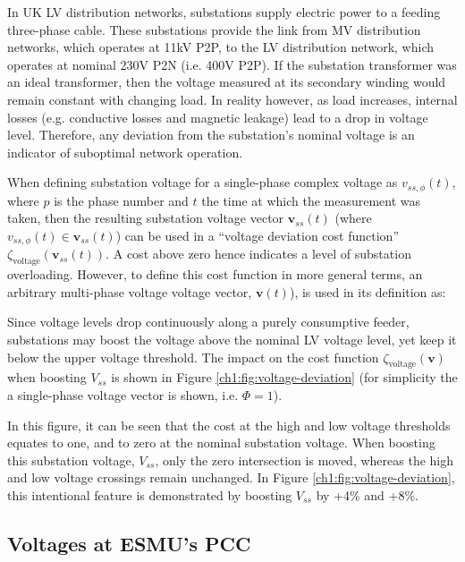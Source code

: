 In UK LV distribution networks, substations supply electric power to a feeding three-phase cable.
These substations provide the link from MV distribution networks, which operates at 11kV P2P, to the LV distribution network, which operates at nominal 230V P2N (i.e. 400V P2P).
If the substation transformer was an ideal transformer, then the voltage measured at its secondary winding would remain constant with changing load.
In reality however, as load increases, internal losses (e.g. conductive losses and magnetic leakage) lead to a drop in voltage level.
Therefore, any deviation from the substation's nominal voltage is an indicator of suboptimal network operation.

When defining substation voltage for a single-phase complex voltage as $v_{ss,\phi}(t)$, where $p$ is the phase number and $t$ the time at which the measurement was taken, then the resulting substation voltage vector $\textbf{v}_{ss}(t)$ (where $v_{ss,\phi}(t) \in \textbf{v}_{ss}(t)$) can be used in a ``voltage deviation cost function'' $\zeta_\text{voltage}(\textbf{v}_{ss}(t))$.
A cost above zero hence indicates a level of substation overloading.
However, to define this cost function in more general terms, an arbitrary multi-phase voltage voltage vector, $\textbf{v}(t)$), is used in its definition as:



Since voltage levels drop continuously along a purely consumptive feeder, substations may boost the voltage above the nominal LV voltage level, yet keep it below the upper voltage threshold.
The impact on the cost function $\zeta_\text{voltage}(\textbf{v})$ when boosting $V_{ss}$ is shown in Figure \ref{ch1:fig:voltage-deviation} (for simplicity the a single-phase voltage vector is shown, i.e. $\Phi = 1$).



In this figure, it can be seen that the cost at the high and low voltage thresholds equates to one, and to zero at the nominal substation voltage.
When boosting this substation voltage, $V_{ss}$, only the zero intersection is moved, whereas the high and low voltage crossings remain unchanged.
In Figure \ref{ch1:fig:voltage-deviation}, this intentional feature is demonstrated by boosting $V_{ss}$ by +4\% and +8\%.

\subsection{Voltages at ESMU's PCC}
\label{ch1:subsec:voltages-at-esmu}

